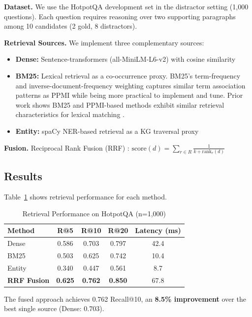 \documentclass[11pt,a4paper]{article}
\begin{document}
\textbf{Dataset.} We use the HotpotQA development set in the distractor setting (1,000 questions). Each question requires reasoning over two supporting paragraphs among 10 candidates (2 gold, 8 distractors).

\textbf{Retrieval Sources.} We implement three complementary sources:
\begin{itemize}
    \item \textbf{Dense:} Sentence-transformers (all-MiniLM-L6-v2) with cosine similarity
    \item \textbf{BM25:} Lexical retrieval as a co-occurrence proxy. BM25's term-frequency and inverse-document-frequency weighting captures similar term association patterns as PPMI while being more practical to implement and tune. Prior work shows BM25 and PPMI-based methods exhibit similar retrieval characteristics for lexical matching \citep{manning2008introduction}.
    \item \textbf{Entity:} spaCy NER-based retrieval as a KG traversal proxy
\end{itemize}

\textbf{Fusion.} Reciprocal Rank Fusion (RRF) \citep{cormack2009rrf}: $\text{score}(d) = \sum_{r \in R} \frac{1}{k + \text{rank}_r(d)}$

\subsection{Results}

Table~\ref{tab:main_results} shows retrieval performance for each method.

\begin{table}[h]
\centering
\caption{Retrieval Performance on HotpotQA (n=1,000)}
\label{tab:main_results}
\begin{tabular}{lcccc}
\toprule
\textbf{Method} & \textbf{R@5} & \textbf{R@10} & \textbf{R@20} & \textbf{Latency (ms)} \\
\midrule
Dense & 0.586 & 0.703 & 0.797 & 42.4 \\
BM25 & 0.503 & 0.625 & 0.742 & 10.4 \\
Entity & 0.340 & 0.447 & 0.561 & 8.7 \\
\midrule
\textbf{RRF Fusion} & \textbf{0.625} & \textbf{0.762} & \textbf{0.850} & 67.8 \\
\bottomrule
\end{tabular}
\end{table}

The fused approach achieves 0.762 Recall@10, an \textbf{8.5\% improvement} over the best single source (Dense: 0.703).
\end{document}
